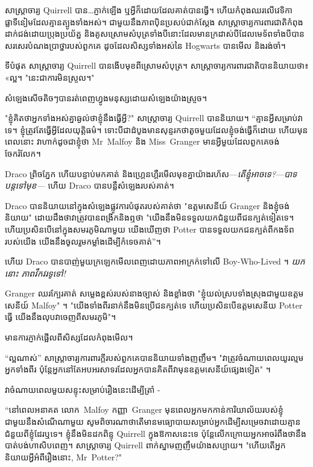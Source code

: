 សាស្រ្តាចារ្យ Quirrell បាន…ភ្ញាក់ឡើង ឬអ្វីក៏ដោយដែលគាត់បានធ្វើ។ ហើយ​កំពុង​ឈរ​លើ​វេទិកា​ផ្លាទីនៀម​ដែល​គ្មាន​ត្បូង​ទាំងអស់។ ជាមួយនឹងភាពប៉ិនប្រសប់ជាក់ស្តែង សាស្រ្តាចារ្យការពារជាតិកំពុងដាក់ជង់ដោយប្រុងប្រយ័ត្ន និងគូសស្រោមសំបុត្រទាំងបីនោះដែលមានក្រដាស់បីដែលមេទ័ពទាំងបីបានសរសេរបំណងប្រាថ្នារបស់ពួកគេ ដូចដែលសិស្សទាំងអស់នៃ Hogwarts បានមើល និងរង់ចាំ។

ទីបំផុត សាស្រ្តាចារ្យ Quirrell បានងើបមុខពីស្រោមសំបុត្រ។ សាស្ត្រាចារ្យ​ការពារ​ជាតិ​បាន​និយាយ​ថា​៖ «​ល្អ​។ "នេះ​ជា​ការ​មិន​ស្រួល​។"

សំឡេង​សើច​តិចៗ​បាន​រត់​ពេញ​ហ្វូង​មនុស្ស​ដោយ​សំឡេង​យ៉ាង​ស្រួច។

"ខ្ញុំគិតថាអ្នកទាំងអស់គ្នាឆ្ងល់ថាខ្ញុំនឹងធ្វើអ្វី?" សាស្ត្រាចារ្យ Quirrell បាននិយាយ។ “គ្មានអ្វីសម្រាប់វាទេ។ ខ្ញុំត្រូវតែធ្វើអ្វីដែលយុត្តិធម៌។ ទោះបីជាដំបូងមានសុន្ទរកថាតូចមួយដែលខ្ញុំចង់ធ្វើក៏ដោយ ហើយមុនពេលនោះ វាហាក់ដូចជាខ្ញុំថា Mr~Malfoy និង Miss~Granger មានអ្វីមួយដែលពួកគេចង់ចែករំលែក។

Draco ព្រិចភ្នែក ហើយបន្ទាប់មកគាត់ និងហ្គ្រេនហ្គឺរមើលមុខគ្នាយ៉ាងរហ័ស—\emph{តើខ្ញុំអាចទេ?}—\emph{បាទ បន្តទៅមុខ—} ហើយ Draco បានបន្លឺសំឡេងរបស់គាត់។

Draco បាននិយាយនៅក្នុងសំឡេងផ្លូវការបំផុតរបស់គាត់ថា "ឧត្តមសេនីយ៍ Granger និងខ្ញុំចង់និយាយ" ដោយដឹងថាវាត្រូវបានពង្រីកនិងឮថា "យើងនឹងមិនទទួលយកជំនួយពីជនក្បត់ទៀតទេ។ ហើយប្រសិនបើនៅក្នុងសមរភូមិណាមួយ យើងឃើញថា Potter បានទទួលយកជនក្បត់ពីកងទ័ពរបស់យើង យើងនឹងចូលរួមកម្លាំងដើម្បីកំទេចគាត់”។

ហើយ Draco បានបាញ់មួយក្រឡេកមើលពេញដោយភាពអាក្រក់ទៅលើ Boy-Who-Lived ។ \emph{យកនោះ ភាពវឹកវរទូទៅ!}

Granger ឈរក្បែរគាត់ សម្លេងខ្ពស់របស់នាងច្បាស់ និងខ្លាំងថា "ខ្ញុំយល់ស្របទាំងស្រុងជាមួយឧត្តមសេនីយ៍ Malfoy" ។ "យើងទាំងពីរនាក់នឹងមិនប្រើជនក្បត់ទេ ហើយប្រសិនបើឧត្តមសេនីយ Potter ធ្វើ យើងនឹងលុបវាចេញពីសមរភូមិ"។

មាន​ការ​ភ្ញាក់​ផ្អើល​ពី​សិស្ស​ដែល​កំពុង​មើល។

“ល្អណាស់” សាស្ត្រាចារ្យការពារក្តីរបស់ពួកគេបាននិយាយទាំងញញឹម។ "វាត្រូវចំណាយពេលយូរល្មមអ្នកទាំងពីរ ប៉ុន្តែអ្នកនៅតែអបអរសាទរដែលអ្នកបានគិតពីវាមុនឧត្តមសេនីយ៍ផ្សេងទៀត" ។

វាចំណាយពេលមួយសន្ទុះសម្រាប់រឿងនេះដើម្បីត្រាំ -

“នៅពេលអនាគត លោក~Malfoy កញ្ញា~Granger មុនពេលអ្នកមកកាន់ការិយាល័យរបស់ខ្ញុំជាមួយនឹងសំណើណាមួយ សូមពិចារណាថាតើមានមធ្យោបាយសម្រាប់អ្នកដើម្បីសម្រេចវាដោយគ្មានជំនួយពីខ្ញុំដែរឬទេ។ ខ្ញុំនឹងមិនដកពិន្ទុ Quirrell ក្នុងឱកាសនេះទេ ប៉ុន្តែលើកក្រោយអ្នកអាចរំពឹងថានឹងបាត់បង់ហាសិបពេញ។ សាស្ត្រាចារ្យ Quirrell ពាក់​ស្នាម​ញញឹម​យ៉ាង​សប្បាយ។ "ហើយតើអ្នកនិយាយអ្វីអំពីរឿងនោះ, Mr~Potter?"

